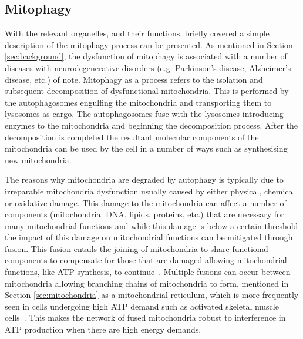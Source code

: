 \subsection{Mitophagy}
With the relevant organelles, and their functions, briefly covered a simple description of the mitophagy process can be presented. As mentioned in Section \ref{sec:background}, the dysfunction of mitophagy is associated with a number of diseases with neurodegenerative disorders (e.g. Parkinson's disease, Alzheimer's disease, etc.) of note. Mitophagy as a process refers to the isolation and subsequent decomposition of dysfunctional mitochondria. This is performed by the autophagosomes engulfing the mitochondria and transporting them to lysosomes as cargo. The autophagosomes fuse with the lysosomes introducing enzymes to the mitochondria and beginning the decomposition process. After the decomposition is completed the resultant molecular components of the mitochondria can be used by the cell in a number of ways such as synthesising new mitochondria.\par The reasons why mitochondria are degraded by autophagy is typically due to irreparable mitochondria dysfunction usually caused by either physical, chemical or oxidative damage. This damage to the mitochondria can affect a number of components (mitochondrial DNA, lipids, proteins, etc.) that are necessary for many mitochondrial functions and while this damage is below a certain threshold the impact of this damage on mitochondrial functions can be mitigated through fusion. This fusion entails the joining of mitochondria to share functional components to compensate for those that are damaged allowing mitochondrial functions, like ATP synthesis, to continue~\cite{MitoFus-2012}. Multiple fusions can occur between mitochondria allowing branching chains of mitochondria to form, mentioned in Section \ref{sec:mitochondria} as a mitochondrial reticulum, which is more frequently seen in cells undergoing high ATP demand such as activated skeletal muscle cells~\cite{cell_phys_book}. This makes the network of fused mitochondria robust to interference in ATP production when there are high energy demands.\par 
